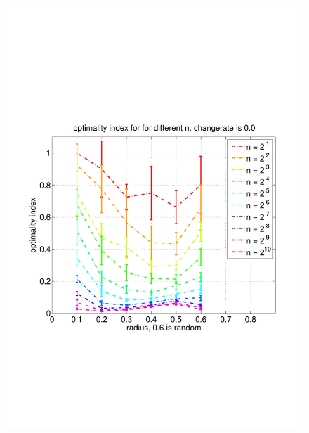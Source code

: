 \documentclass[11pt]{article}
\begin{document}
\begin{figure}
	\includegraphics[width=\linewidth]{../../code/data/2014_12_12_00_55_41/figure_4}
\end{figure}
\end{document}

